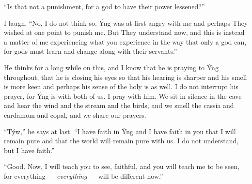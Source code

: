 ``Is that not a punishment, for a god to have their power lessened?''

I laugh. ``No, I do not think so. Ýng was at first angry with me and perhaps They wished at one point to punish me. But They understand now, and this is instead a matter of me experiencing what you experience in the way that only a god can, for gods must learn and change along with their servants.''

He thinks for a long while on this, and I know that he is praying to Ýng throughout, that he is closing his eyes so that his hearing is sharper and his smell is more keen and perhaps his sense of the holy is as well. I do not interrupt his prayer, for Ýng is with both of us. I pray with him. We sit in silence in the cave and hear the wind and the stream and the birds, and we smell the cassia and cardamom and copal, and we share our prayers.

``Týw,'' he says at last. ``I have faith in Ýng and I have faith in you that I will remain pure and that the world will remain pure with us. I do not understand, but I have faith.''

``Good. Now, I will teach you to see, faithful, and you will teach me to be seen, for everything --- \emph{everything} --- will be different now.''
